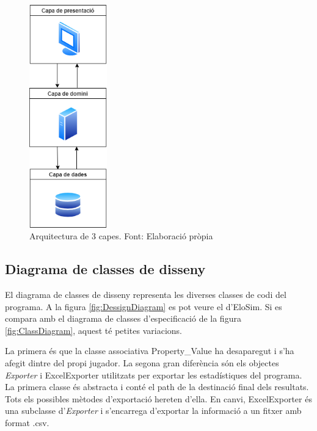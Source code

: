 \documentclass[a4paper]{article}
\begin{document}
\begin{figure}[H]
    \centering
    \includegraphics[width=0.3\textwidth]{images/3-capes.png}
    \caption[Arquitectura de 3 capes]{Arquitectura de 3 capes. Font: Elaboració pròpia}
    \label{fig:ArchitectureCapes}
\end{figure}

\subsection{Diagrama de classes de disseny}

El diagrama de classes de disseny representa les diverses classes de codi del programa.  A la figura \ref{fig:DessignDiagram} es pot veure el d'EloSim. Si es compara amb el diagrama de classes d'especificació de la figura \ref{fig:ClassDiagram}, aquest té petites variacions.

La primera és que la classe associativa Property\_Value ha desaparegut i s'ha afegit dintre del propi jugador. La segona gran diferència són els objectes \textit{Exporter} i ExcelExporter utilitzats per exportar les estadístiques del programa. La primera classe és abstracta i conté el path de la destinació final dels resultats. Tots els possibles mètodes d'exportació hereten d'ella. En canvi, ExcelExporter és una subclasse d'\textit{Exporter} i s'encarrega d'exportar la informació a un fitxer amb format .csv.
\end{document}
